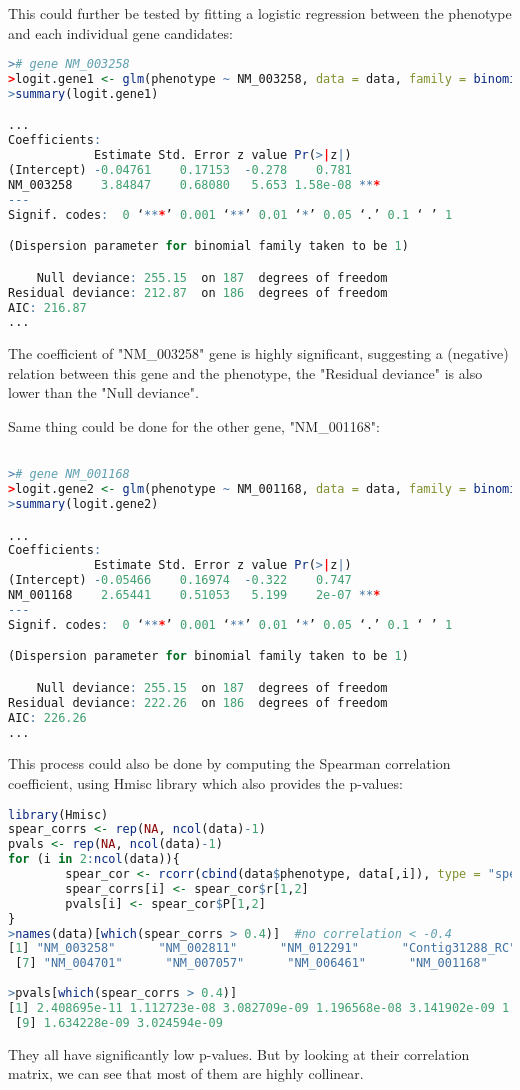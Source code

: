 \documentclass[11pt]{article}
\begin{document}
This could further be tested by fitting a logistic regression between the phenotype and each individual gene candidates:
\begin{lstlisting}[language=R, breaklines=true, basicstyle=\ttfamily]
># gene NM_003258
>logit.gene1 <- glm(phenotype ~ NM_003258, data = data, family = binomial(link = "logit"))
>summary(logit.gene1)

...
Coefficients:
            Estimate Std. Error z value Pr(>|z|)    
(Intercept) -0.04761    0.17153  -0.278    0.781    
NM_003258    3.84847    0.68080   5.653 1.58e-08 ***
---
Signif. codes:  0 ‘***’ 0.001 ‘**’ 0.01 ‘*’ 0.05 ‘.’ 0.1 ‘ ’ 1

(Dispersion parameter for binomial family taken to be 1)

    Null deviance: 255.15  on 187  degrees of freedom
Residual deviance: 212.87  on 186  degrees of freedom
AIC: 216.87
...
\end{lstlisting}
The coefficient of "NM\_003258" gene is highly significant, suggesting a (negative) relation between this gene and the phenotype, the "Residual deviance" is also lower than the "Null deviance".

Same thing could be done for the other gene, "NM\_001168":
\begin{lstlisting}[language=R, breaklines=true, basicstyle=\ttfamily]

># gene NM_001168
>logit.gene2 <- glm(phenotype ~ NM_001168, data = data, family = binomial(link = "logit"))
>summary(logit.gene2)

...
Coefficients:
            Estimate Std. Error z value Pr(>|z|)    
(Intercept) -0.05466    0.16974  -0.322    0.747    
NM_001168    2.65441    0.51053   5.199    2e-07 ***
---
Signif. codes:  0 ‘***’ 0.001 ‘**’ 0.01 ‘*’ 0.05 ‘.’ 0.1 ‘ ’ 1

(Dispersion parameter for binomial family taken to be 1)

    Null deviance: 255.15  on 187  degrees of freedom
Residual deviance: 222.26  on 186  degrees of freedom
AIC: 226.26
...
\end{lstlisting}

This process could also be done by computing the Spearman correlation coefficient, using Hmisc library which also provides the p-values:
\begin{lstlisting}[language=R, breaklines=true, basicstyle=\ttfamily]
library(Hmisc)
spear_corrs <- rep(NA, ncol(data)-1)
pvals <- rep(NA, ncol(data)-1)
for (i in 2:ncol(data)){
        spear_cor <- rcorr(cbind(data$phenotype, data[,i]), type = "spearman")
        spear_corrs[i] <- spear_cor$r[1,2]
        pvals[i] <- spear_cor$P[1,2]
}
>names(data)[which(spear_corrs > 0.4)]	#no correlation < -0.4
[1] "NM_003258"      "NM_002811"      "NM_012291"      "Contig31288_RC" "NM_003981"      "NM_014176"     
 [7] "NM_004701"      "NM_007057"      "NM_006461"      "NM_001168"
 
>pvals[which(spear_corrs > 0.4)]
[1] 2.408695e-11 1.112723e-08 3.082709e-09 1.196568e-08 3.141902e-09 1.218462e-08 1.240741e-08 3.141902e-09
 [9] 1.634228e-09 3.024594e-09
\end{lstlisting}
They all have significantly low p-values. But by looking at their correlation matrix, we can see that most of them are highly collinear.
\end{document}

